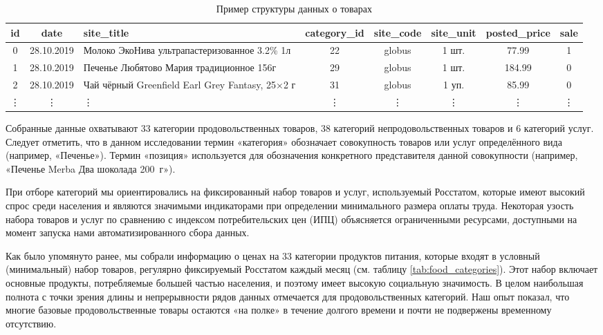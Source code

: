 \begin{table}[h!]
	\centering
	\caption{Пример структуры данных о товарах}
	\label{tab:product_data}
	\scriptsize
	\begin{tabular}{|c|c|p{4cm}|c|c|c|c|c|}
		\hline
		\textbf{id} & \textbf{date} & \textbf{site\_title} & \textbf{category\_id} & \textbf{site\_code} & \textbf{site\_unit} & \textbf{posted\_price} & \textbf{sale} \\ \hline
		0 & 28.10.2019 & Молоко ЭкоНива ультрапастеризованное 3.2\% 1л & 22 & globus & 1 шт. & 77.99 & 1 \\ \hline
		1 & 28.10.2019 & Печенье Любятово Мария традиционное 156г & 29 & globus & 1 шт. & 184.99 & 0 \\ \hline
		2 & 28.10.2019 & Чай чёрный Greenfield Earl Grey Fantasy, 25×2 г & 31 & globus & 1 уп. & 85.99 & 0 \\ \hline
		\vdots & \vdots & \vdots & \vdots & \vdots & \vdots & \vdots & \vdots \\ \hline
	\end{tabular}
\end{table}


Собранные данные охватывают 33 категории продовольственных товаров, 38 категорий непродовольственных товаров и 6 категорий услуг. Следует отметить, что в данном исследовании термин «категория» обозначает совокупность товаров или услуг определённого вида (например, «Печенье»). Термин «позиция» используется для обозначения конкретного представителя данной совокупности (например, «Печенье Merba Два шоколада 200~г»).

При отборе категорий мы ориентировались на фиксированный набор товаров и услуг, используемый Росстатом, которые имеют высокий спрос среди населения и являются значимыми индикаторами при определении минимального размера оплаты труда. Некоторая узость набора товаров и услуг по сравнению с индексом потребительских цен (ИПЦ) объясняется ограниченными ресурсами, доступными на момент запуска нами автоматизированного сбора данных.

Как было упомянуто ранее, мы собрали информацию о ценах на 33 категории продуктов питания, которые входят в условный (минимальный) набор товаров, регулярно фиксируемый Росстатом каждый месяц (см. таблицу \ref{tab:food_categories}). Этот набор включает основные продукты, потребляемые большей частью населения, и поэтому имеет высокую социальную значимость. В целом наибольшая полнота с точки зрения длины и непрерывности рядов данных отмечается для продовольственных категорий. Наш опыт показал, что многие базовые продовольственные товары остаются «на полке» в течение долгого времени и почти не подвержены временному отсутствию.

